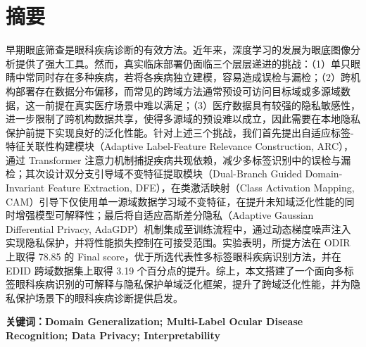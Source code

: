 \section*{摘要}\label{ux6458ux8981}

早期眼底筛查是眼科疾病诊断的有效方法。近年来，深度学习的发展为眼底图像分析提供了强大工具。然而，真实临床部署仍面临三个层层递进的挑战：（1）单只眼睛中常同时存在多种疾病，若将各疾病独立建模，容易造成误检与漏检；（2）跨机构部署存在数据分布偏移，而常见的跨域方法通常预设可访问目标域或多源域数据，这一前提在真实医疗场景中难以满足；（3）医疗数据具有较强的隐私敏感性，进一步限制了跨机构数据共享，使得多源域的预设难以成立，因此需要在本地隐私保护前提下实现良好的泛化性能。针对上述三个挑战，我们首先提出自适应标签-特征关联性构建模块（Adaptive Label-Feature Relevance Construction, ARC），通过 Transformer 注意力机制捕捉疾病共现依赖，减少多标签识别中的误检与漏检；其次设计双分支引导域不变特征提取模块（Dual-Branch Guided Domain-Invariant Feature Extraction, DFE），在类激活映射（Class Activation Mapping, CAM）引导下仅使用单一源域数据学习域不变特征，在提升未知域泛化性能的同时增强模型可解释性；最后将自适应高斯差分隐私（Adaptive Gaussian Differential Privacy, AdaGDP）机制集成至训练流程中，通过动态梯度噪声注入实现隐私保护，并将性能损失控制在可接受范围。实验表明，所提方法在 ODIR 上取得 78.85 的 Final score，优于所选代表性多标签眼科疾病识别方法，并在 EDID 跨域数据集上取得 3.19 个百分点的提升。综上，本文搭建了一个面向多标签眼科疾病识别的可解释与隐私保护单域泛化框架，提升了跨域泛化性能，并为隐私保护场景下的眼科疾病诊断提供启发。

\noindent\textbf{关键词：}\textbf{Domain Generalization; Multi-Label Ocular Disease Recognition; Data Privacy; Interpretability}
